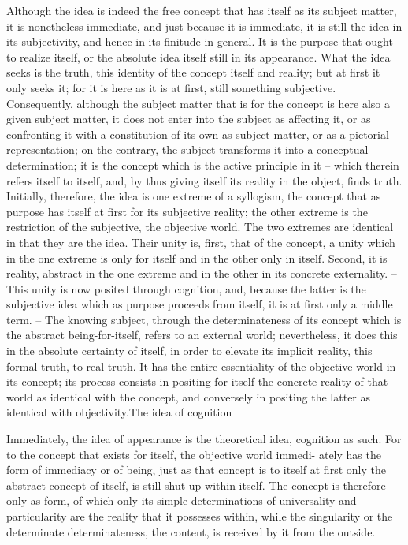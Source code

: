Although the idea is indeed the free concept that has itself as its subject
matter, it is nonetheless immediate, and just because it is immediate, it is
still the idea in its subjectivity, and hence in its finitude in general. It is
the purpose that ought to realize itself, or the absolute idea itself still in its
appearance. What the idea seeks is the truth, this identity of the concept
itself and reality; but at first it only seeks it; for it is here as it is at first, still
something subjective. Consequently, although the subject matter that is for
the concept is here also a given subject matter, it does not enter into the
subject as affecting it, or as confronting it with a constitution of its own as
subject matter, or as a pictorial representation; on the contrary, the subject
transforms it into a conceptual determination; it is the concept which is the
active principle in it – which therein refers itself to itself, and, by thus
giving itself its reality in the object, finds truth.
Initially, therefore, the idea is one extreme of a syllogism, the concept
that as purpose has itself at first for its subjective reality; the other extreme is
the restriction of the subjective, the objective world. The two extremes are
identical in that they are the idea. Their unity is, first, that of the concept,
a unity which in the one extreme is only for itself and in the other only in
itself. Second, it is reality, abstract in the one extreme and in the other in
its concrete externality. – This unity is now posited through cognition, and,
because the latter is the subjective idea which as purpose proceeds from
itself, it is at first only a middle term. – The knowing subject, through the
determinateness of its concept which is the abstract being-for-itself, refers
to an external world; nevertheless, it does this in the absolute certainty
of itself, in order to elevate its implicit reality, this formal truth, to real
truth. It has the entire essentiality of the objective world in its concept; its
process consists in positing for itself the concrete reality of that world as
identical with the concept, and conversely in positing the latter as identical
with objectivity.The idea of cognition

Immediately, the idea of appearance is the theoretical idea, cognition as
such. For to the concept that exists for itself, the objective world immedi-
ately has the form of immediacy or of being, just as that concept is to itself
at first only the abstract concept of itself, is still shut up within itself. The
concept is therefore only as form, of which only its simple determinations
of universality and particularity are the reality that it possesses within, while
the singularity or the determinate determinateness, the content, is received
by it from the outside.

